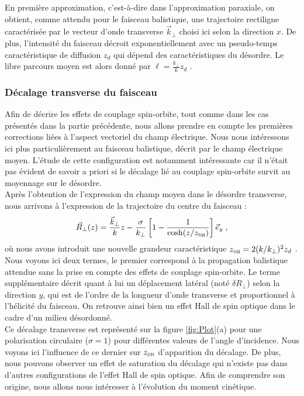 \documentclass[a4paper,11pt]{article} %
\begin{document}
	En première approximation, c'est-à-dire dans l'approximation paraxiale, on obtient, comme attendu pour le faisceau balistique, une trajectoire rectiligne caractérisée par le vecteur d'onde transverse $ \vec{k}_\perp $ choisi ici selon la direction $x$. De plus, l'intensité du faisceau décroit exponentiellement avec un pseudo-temps caractéristique de diffusion $ z_d $ qui dépend des caractéristiques du désordre. Le libre parcours moyen est alors donné par $ \ell = \frac{k_\perp}{k} z_d $ .
	
	\subsubsection{Décalage transverse du faisceau}
	
	Afin de décrire les effets de couplage spin-orbite, tout comme dans les cas présentés dans la partie précédente, nous allons prendre en compte les premières corrections liées à l'aspect vectoriel du champ électrique. Nous nous intéressons ici plus particulièrement au faisceau balistique, décrit par le champ électrique moyen. L'étude de cette configuration est notamment intéressante car il n'était pas évident de savoir a priori si le décalage lié au couplage spin-orbite survit au moyennage sur le désordre.\\
	
	Après l'obtention de l'expression du champ moyen dans le désordre transverse, nous arrivons à l'expression de la trajectoire du centre du faisceau :
	\begin{equation}
		\vec{R}_\perp (z) = \frac{\vec{k}_\perp}{k} z - \frac{\sigma}{k_\perp} \left[ 1 - \frac{1}{\cosh (z/z_\text{\tiny SH})} \right] \vec{e}_y \; ,
	\end{equation}
	où nous avons introduit une nouvelle grandeur caractéristique $ z_\text{{\tiny SH}} = 2 (k/k_\perp)^2 z_d  $ . Nous voyons ici deux termes, le premier correspond à la propagation balistique attendue sans la prise en compte des effets de couplage spin-orbite. Le terme supplémentaire décrit quant à lui un déplacement latéral (noté $ \delta R_\perp $) selon la direction $y$, qui est de l'ordre de la longueur d'onde transverse et proportionnel à l'hélicité du faisceau. On retrouve ainsi bien un effet Hall de spin optique dans le cadre d'un milieu désordonné.\\
	
	
	Ce décalage transverse est représenté sur la figure \ref{fig:Plot}(a) pour une polarisation circulaire ($\sigma = 1$) pour différentes valeurs de l'angle d'incidence. Nous voyons ici l'influence de ce dernier sur $ z_\text{{\tiny SH}} $ d'apparition du décalage. De plus, nous pouvons observer un effet de saturation du décalage qui n'existe pas dans d'autres configurations de l'effet Hall de spin optique. Afin de comprendre son origine, nous allons nous intéresser à l'évolution du moment cinétique.
	
\end{document}
